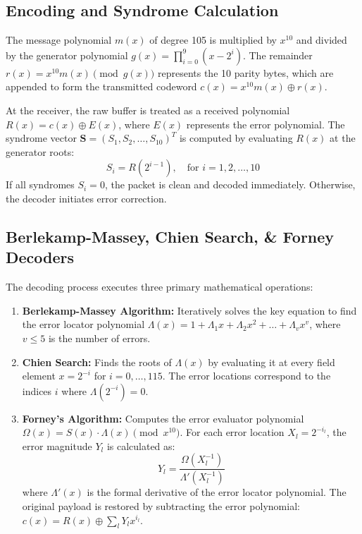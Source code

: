 \documentclass[12pt,a4paper]{article}
\begin{document}
\subsection{Encoding and Syndrome Calculation}
The message polynomial $m(x)$ of degree 105 is multiplied by $x^{10}$ and divided by the generator polynomial $g(x) = \prod_{i=0}^{9} (x - 2^i)$. The remainder $r(x) = x^{10}m(x) \pmod{g(x)}$ represents the 10 parity bytes, which are appended to form the transmitted codeword $c(x) = x^{10}m(x) \oplus r(x)$.

At the receiver, the raw buffer is treated as a received polynomial $R(x) = c(x) \oplus E(x)$, where $E(x)$ represents the error polynomial. The syndrome vector $\mathbf{S} = (S_1, S_2, \dots, S_{10})^T$ is computed by evaluating $R(x)$ at the generator roots:
\begin{equation}
    S_i = R(2^{i-1}), \quad \text{for } i = 1, 2, \dots, 10
\end{equation}
If all syndromes $S_i = 0$, the packet is clean and decoded immediately. Otherwise, the decoder initiates error correction.

\subsection{Berlekamp-Massey, Chien Search, \& Forney Decoders}
The decoding process executes three primary mathematical operations:
\begin{enumerate}
    \item \textbf{Berlekamp-Massey Algorithm:} Iteratively solves the key equation to find the error locator polynomial $\Lambda(x) = 1 + \Lambda_1 x + \Lambda_2 x^2 + \dots + \Lambda_v x^v$, where $v \le 5$ is the number of errors.
    \item \textbf{Chien Search:} Finds the roots of $\Lambda(x)$ by evaluating it at every field element $x = 2^{-i}$ for $i=0, \dots, 115$. The error locations correspond to the indices $i$ where $\Lambda(2^{-i}) = 0$.
    \item \textbf{Forney's Algorithm:} Computes the error evaluator polynomial $\Omega(x) = S(x) \cdot \Lambda(x) \pmod{x^{10}}$. For each error location $X_l = 2^{-i_l}$, the error magnitude $Y_l$ is calculated as:
    \begin{equation}
        Y_l = \frac{\Omega(X_l^{-1})}{\Lambda'(X_l^{-1})}
    \end{equation}
    where $\Lambda'(x)$ is the formal derivative of the error locator polynomial. The original payload is restored by subtracting the error polynomial: $c(x) = R(x) \oplus \sum_l Y_l x^{i_l}$.
\end{enumerate}
\end{document}
